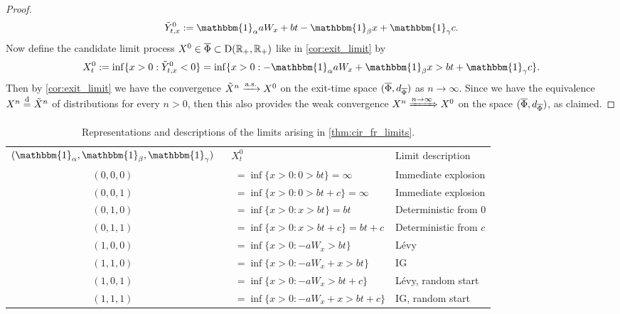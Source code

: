 \begin{proof}
    \begin{equation}
        \tY^0_{t,x} := \mathbbm{1}_\alpha a W_x + bt - \mathbbm{1}_\beta x + \mathbbm{1}_\gamma c.
    \end{equation}
    Now define the candidate limit process $X^0\in\overline{\Phi}\subset\mathrm{D}(\mathbb{R}_+,\mathbb{R}_+)$ like in \autoref{cor:exit_limit} by
    \begin{equation}
        X^0_t :=\inf\{x>0:\tY^0_{t,x}<0\} = \inf\{ x>0: - \mathbbm{1}_\alpha a W_x + \mathbbm{1}_\beta x > bt + \mathbbm{1}_\gamma c \}.
    \end{equation}
    Then by \autoref{cor:exit_limit} we have the convergence $\tilde{X}^n\xrightarrow{\mathrm{a.s.}} X^0$ on the exit-time space $(\overline{\Phi},d_{\overline{\Phi}})$ as $n\to\infty$. Since we have the equivalence $X^n\stackrel{\mathrm{d}}{=} \tilde{X}^n$ of distributions for every $n>0$, then this also provides the weak convergence $X^n\xRightarrow{n\to\infty} X^0$ on the space $(\overline{\Phi},d_{\overline{\Phi}})$, as claimed.
\end{proof}

\begin{table}[ht]
    \begin{center}
        \begin{tabular}{ c l l }
         $(\mathbbm{1}_\alpha,\mathbbm{1}_\beta,\mathbbm{1}_\gamma)$ & $\ \ \ X^0_t$ & Limit description \\
         $(0,0,0)$ & $\quad=\inf\bigg\{ x>0: 0 > bt \bigg\}=\infty$ & Immediate explosion \\
         $(0,0,1)$ & $\quad=\inf\bigg\{ x>0: 0 > bt + c \bigg\}=\infty$ & Immediate explosion \\
         $(0,1,0)$ & $\quad=\inf\bigg\{ x>0: x > bt \bigg\}=bt$ & Deterministic from 0 \\
         $(0,1,1)$ & $\quad=\inf\bigg\{ x>0: x > bt + c \bigg\}= bt + c$ & Deterministic from $c$\\
         $(1,0,0)$ & $\quad=\inf\bigg\{ x>0: -a W_x > bt \bigg\}$ & L\'evy \\
         $(1,1,0)$ & $\quad=\inf\bigg\{ x>0: -a W_x + x > bt \bigg\}$ & IG\\
         $(1,0,1)$ & $\quad=\inf\bigg\{ x>0: -a W_x > bt + c \bigg\}$ & L\'evy, random start \\
         $(1,1,1)$ & $\quad=\inf\bigg\{ x>0: -a W_x + x > bt + c \bigg\}$ & IG, random start
        \end{tabular}
        \caption{
            Representations and descriptions of the limits arising in \autoref{thm:cir_fr_limits}.
        }\label{tab:cir_limits}
    \end{center}
    \vspace{-4mm}
\end{table}

